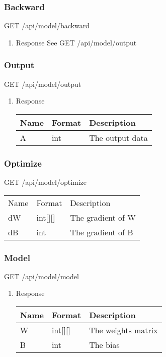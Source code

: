 \documentclass[11pt]{article}
\begin{document}
\subsubsection{Backward}
\label{sec:org7650fcb}
GET /api/model/backward
\begin{enumerate}
\item Response
\label{sec:orga3d67dc}
See GET /api/model/output
\end{enumerate}
\subsubsection{Output}
\label{sec:orgf4739aa}
GET /api/model/output
\begin{enumerate}
\item Response
\label{sec:orgcb51652}
\begin{center}
\begin{tabular}{lll}
Name & Format & Description\\
\hline
A & int & The output data\\
\end{tabular}
\end{center}
\end{enumerate}
\subsubsection{Optimize}
\label{sec:orgdb45025}
GET /api/model/optimize
\begin{center}
\begin{tabular}{lll}
Name & Format & Description\\
dW & int[][] & The gradient of W\\
dB & int & The gradient of B\\
\end{tabular}
\end{center}
\subsubsection{Model}
\label{sec:org66ca10e}
GET /api/model/model
\begin{enumerate}
\item Response
\label{sec:org959579a}
\begin{center}
\begin{tabular}{lll}
Name & Format & Description\\
\hline
W & int[][] & The weights matrix\\
B & int & The bias\\
\end{tabular}
\end{center}
\end{enumerate}
\end{document}
